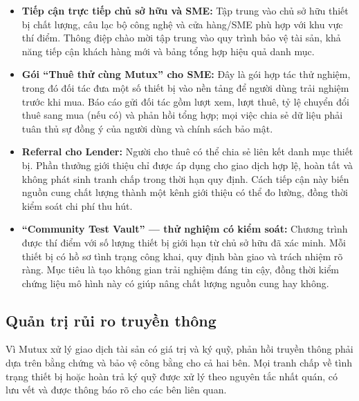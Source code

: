 \begin{itemize}
    \item \textbf{Tiếp cận trực tiếp chủ sở hữu và SME:} Tập trung vào chủ sở hữu thiết bị chất lượng, câu lạc bộ công nghệ và cửa hàng/SME phù hợp với khu vực thí điểm. Thông điệp chào mời tập trung vào quy trình bảo vệ tài sản, khả năng tiếp cận khách hàng mới và bảng tổng hợp hiệu quả danh mục.

    \item \textbf{Gói ``Thuê thử cùng Mutux'' cho SME:} Đây là gói hợp tác thử nghiệm, trong đó đối tác đưa một số thiết bị vào nền tảng để người dùng trải nghiệm trước khi mua. Báo cáo gửi đối tác gồm lượt xem, lượt thuê, tỷ lệ chuyển đổi thuê sang mua (nếu có) và phản hồi tổng hợp; mọi việc chia sẻ dữ liệu phải tuân thủ sự đồng ý của người dùng và chính sách bảo mật.

    \item \textbf{Referral cho Lender:} Người cho thuê có thể chia sẻ liên kết danh mục thiết bị. Phần thưởng giới thiệu chỉ được áp dụng cho giao dịch hợp lệ, hoàn tất và không phát sinh tranh chấp trong thời hạn quy định. Cách tiếp cận này biến nguồn cung chất lượng thành một kênh giới thiệu có thể đo lường, đồng thời kiểm soát chi phí thu hút.

    \item \textbf{``Community Test Vault'' --- thử nghiệm có kiểm soát:} Chương trình được thí điểm với số lượng thiết bị giới hạn từ chủ sở hữu đã xác minh. Mỗi thiết bị có hồ sơ tình trạng công khai, quy định bàn giao và trách nhiệm rõ ràng. Mục tiêu là tạo không gian trải nghiệm đáng tin cậy, đồng thời kiểm chứng liệu mô hình này có giúp nâng chất lượng nguồn cung hay không.
\end{itemize}

\subsection{Quản trị rủi ro truyền thông}

Vì Mutux xử lý giao dịch tài sản có giá trị và ký quỹ, phản hồi truyền thông phải dựa trên bằng chứng và bảo vệ công bằng cho cả hai bên. Mọi tranh chấp về tình trạng thiết bị hoặc hoàn trả ký quỹ được xử lý theo nguyên tắc nhất quán, có lưu vết và được thông báo rõ cho các bên liên quan.

